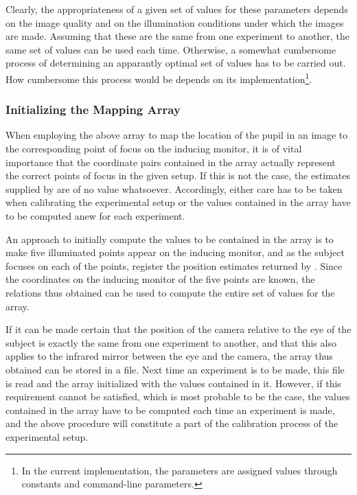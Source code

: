 Clearly, the appropriateness of a given set of values for these
parameters depends on the image quality and on the illumination
conditions under which the images are made.  Assuming that these are
the same from one experiment to another, the same set of values can be
used each time.  Otherwise, a somewhat cumbersome process of
determining an apparantly optimal set of values has to be carried out.
How cumbersome this process would be depends on its
implementation\footnote{In the current implementation, the parameters
  are assigned values through constants and command-line parameters.}.

\subsubsection{Initializing the Mapping Array}

When employing the above array to map the location of the pupil in an
image to the corresponding point of focus on the inducing monitor, it
is of vital importance that the coordinate pairs contained in the
array actually represent the correct points of focus in the given
setup.  If this is not the case, the estimates supplied by {\octopus}
are of no value whatsoever.  Accordingly, either care has to be taken
when calibrating the experimental setup or the values contained in
the array have to be computed anew for each experiment.

An approach to initially compute the values to be contained in the
array is to make five illuminated points appear on the inducing
monitor, and as the subject focuses on each of the points, register
the position estimates returned by {\octopus}.  Since the coordinates
on the inducing monitor of the five points are known, the relations
thus obtained can be used to compute the entire set of values for the
array.

If it can be made certain that the position of the camera relative to
the eye of the subject is exactly the same from one experiment to
another, and that this also applies to the infrared mirror between the
eye and the camera, the array thus obtained can be stored in a file.
Next time an experiment is to be made, this file is read and the array
initialized with the values contained in it.  However, if this
requirement cannot be satisfied, which is most probable to be the
case, the values contained in the array have to be computed each time
an experiment is made, and the above procedure will constitute a part
of the calibration process of the experimental setup.


